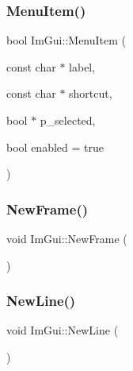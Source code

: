 \hypertarget{namespace_im_gui_a237e76bff3088f1c2622f4aebae2356e}{}\label{namespace_im_gui_a237e76bff3088f1c2622f4aebae2356e} 
\subsubsection{\texorpdfstring{Menu\+Item()}{MenuItem()}\hspace{0.1cm}{\footnotesize\ttfamily [2/2]}}
{\footnotesize\ttfamily bool Im\+Gui\+::\+Menu\+Item (\begin{DoxyParamCaption}\item[{const char $\ast$}]{label,  }\item[{const char $\ast$}]{shortcut,  }\item[{bool $\ast$}]{p\+\_\+selected,  }\item[{bool}]{enabled = {\ttfamily true} }\end{DoxyParamCaption})}

\hypertarget{namespace_im_gui_ab3f1fc018f903b7ad79fd10663375774}{}\label{namespace_im_gui_ab3f1fc018f903b7ad79fd10663375774} 
\subsubsection{\texorpdfstring{New\+Frame()}{NewFrame()}}
{\footnotesize\ttfamily void Im\+Gui\+::\+New\+Frame (\begin{DoxyParamCaption}{ }\end{DoxyParamCaption})}

\hypertarget{namespace_im_gui_a77f8b0a33e5335f98661f99e720411da}{}\label{namespace_im_gui_a77f8b0a33e5335f98661f99e720411da} 
\subsubsection{\texorpdfstring{New\+Line()}{NewLine()}}
{\footnotesize\ttfamily void Im\+Gui\+::\+New\+Line (\begin{DoxyParamCaption}{ }\end{DoxyParamCaption})}

\hypertarget{namespace_im_gui_a8f97746d6a9d59c8400c26fb7613a2ff}{}\label{namespace_im_gui_a8f97746d6a9d59c8400c26fb7613a2ff} 
